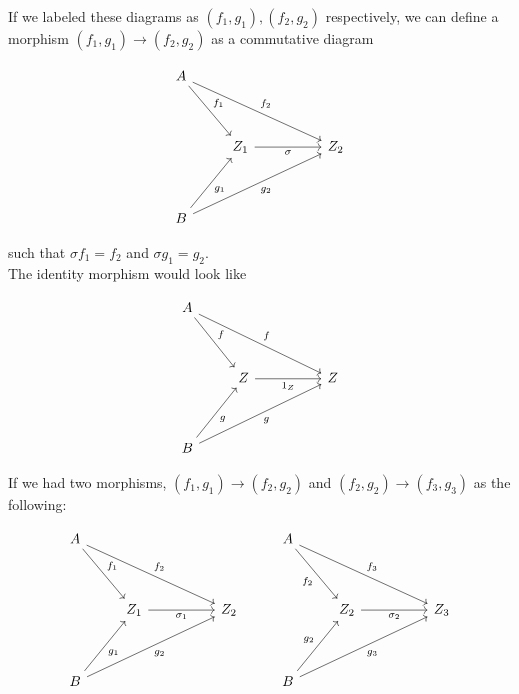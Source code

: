 If we labeled these diagrams as $(f_1, g_1), (f_2, g_2)$ respectively, we can define a morphism $(f_1, g_1) \rightarrow (f_2, g_2)$ as a commutative diagram 

\[\begin{tikzcd}
	A \\
	\\
	& {Z_1} && {Z_2} \\
	\\
	B
	\arrow["{f_1}", from=1-1, to=3-2]
	\arrow["{f_2}", from=1-1, to=3-4]
	\arrow["\sigma"', from=3-2, to=3-4]
	\arrow["{g_1}"', from=5-1, to=3-2]
	\arrow["{g_2}"', from=5-1, to=3-4]
\end{tikzcd}\]

such that $\sigma f_1 = f_2$ and $\sigma g_1 = g_2$. \\

The identity morphism would look like 

\[\begin{tikzcd}
	A \\
	\\
	& Z && Z \\
	\\
	B
	\arrow["f", from=1-1, to=3-2]
	\arrow["f", from=1-1, to=3-4]
	\arrow["{1_Z}"', from=3-2, to=3-4]
	\arrow["g"', from=5-1, to=3-2]
	\arrow["g"', from=5-1, to=3-4]
\end{tikzcd}\]

If we had two morphisms, $(f_1, g_1) \rightarrow (f_2, g_2)$ and $(f_2, g_2) \rightarrow (f_3, g_3)$ as the following:

\[\begin{tikzcd}
	A &&&& A \\
	\\
	& {Z_1} && {Z_2} && {Z_2} && {Z_3} \\
	\\
	B &&&& B
	\arrow["{f_1}", from=1-1, to=3-2]
	\arrow["{f_2}", from=1-1, to=3-4]
	\arrow["{f_2}"', from=1-5, to=3-6]
	\arrow["{f_3}", from=1-5, to=3-8]
	\arrow["{\sigma_1}"', from=3-2, to=3-4]
	\arrow["{\sigma_2}"', from=3-6, to=3-8]
	\arrow["{g_1}"', from=5-1, to=3-2]
	\arrow["{g_2}"', from=5-1, to=3-4]
	\arrow["{g_2}", from=5-5, to=3-6]
	\arrow["{g_3}"', from=5-5, to=3-8]
\end{tikzcd}\]


